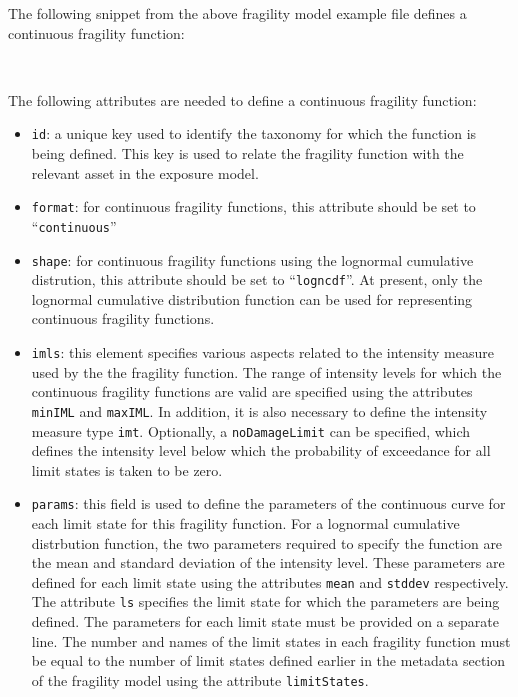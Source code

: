 The following snippet from the above \gls{fragility model} example file
defines a continuous \gls{fragility function}:

\inputminted[firstline=19,firstnumber=19,lastline=25,fontsize=\footnotesize,frame=single,linenos,bgcolor=lightgray]{xml}{oqum/risk/Verbatim/input_fragility.xml}\\

The following attributes are needed to define a continuous \gls{fragility function}:

\begin{itemize}

    \item \Verb+id+: a unique key used to identify the \gls{taxonomy} for 
    which the function is being defined. This key is used to relate the 
    \gls{fragility function} with the relevant \gls{asset} in the 
    \gls{exposure model}.

    \item \Verb+format+: for continuous fragility functions, this attribute 
    should be set to ``\Verb+continuous+''

    \item \Verb+shape+: for continuous fragility functions using the lognormal
    cumulative distrution, this attribute should be set to ``\Verb+logncdf+''.
    At present, only the lognormal cumulative distribution function can be 
    used for representing continuous fragility functions.

    \item \Verb+imls+: this element specifies various aspects related to the 
    intensity measure used by the the \gls{fragility function}. The range of 
    intensity levels for which the continuous fragility functions are valid 
    are specified using the attributes \Verb+minIML+ and \Verb+maxIML+. 
    In addition, it is also necessary to define the intensity measure type 
    \Verb+imt+. Optionally, a \Verb+noDamageLimit+ can be specified, which 
    defines the intensity level below which the probability of exceedance 
    for all limit states is taken to be zero.

    \item \Verb+params+: this field is used to define the parameters of the 
    continuous curve for each limit state for this 
    \gls{fragility function}. For a lognormal cumulative distrbution function, 
    the two parameters required to specify the function are the mean and 
    standard deviation of the intensity level. These parameters are defined for 
    each limit state using the attributes \Verb+mean+ and \Verb+stddev+ 
    respectively. The attribute \Verb+ls+ specifies the limit state for which 
    the parameters are being defined. The parameters for each limit state
    must be provided on a separate line. The number and names of the limit 
    states in each fragility function must be equal to the number of limit 
    states defined earlier in the metadata section of the \gls{fragility model}
    using the attribute \Verb+limitStates+.

\end{itemize}


